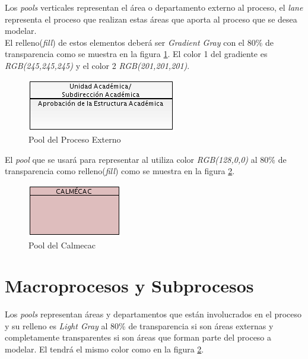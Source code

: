 Los \textit{pools} verticales representan el área o departamento externo al proceso, el \textit{lane} representa el proceso que realizan estas áreas que aporta al proceso que se desea modelar.\\
El relleno(\textit{fill}) de estos elementos deberá ser \textit{Gradient Gray} con el 80\% de transparencia como se muestra en la figura \ref{fig:poolExterno}. El color 1 del gradiente es \textit{RGB(245,245,245)} y el color 2 \textit{RGB(201,201,201)}.

\begin{figure}[hbtp!]
	\begin{center}
		\includegraphics[width=.3\textwidth]{introduccion/imagenes/procesos/PoolExterno}
		\caption{Pool del Proceso Externo}
		\label{fig:poolExterno}
	\end{center}
\end{figure}

El \textit{pool} que se usará para representar al  utiliza color \textit{RGB(128,0,0)} al 80\% de transparencia como relleno(\textit{fill}) como se muestra en la figura \ref{fig:poolCalmecac}.

\begin{figure}[hbtp!]
	\begin{center}
		\includegraphics[width=.3\textwidth]{introduccion/imagenes/procesos/PoolCalmecac}
		\caption{Pool del Calmecac}
		\label{fig:poolCalmecac}
	\end{center}
\end{figure}

\section{Macroprocesos y Subprocesos}

Los \textit{pools} representan áreas y departamentos que están involucrados en el proceso y su relleno es \textit{Light Gray} al 80\% de transparencia si son áreas externas y completamente transparentes si son áreas que forman parte del proceso a modelar.
El  tendrá el mismo color como en la figura \ref{fig:poolCalmecac}.

